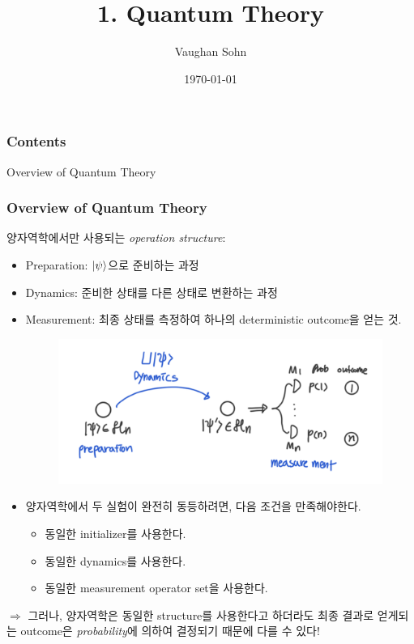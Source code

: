 \documentclass[9pt]{beamer}
\title{1. Quantum Theory}
\date{\today}
\author{Vaughan Sohn}
\begin{document}
    \maketitle
    
    \begin{frame}
        \frametitle{Contents}
        \tableofcontents
    \end{frame}

    \begin{section}{Overview of Quantum Theory}
        \begin{frame}
            \frametitle{Overview of Quantum Theory}
            양자역학에서만 사용되는 \textit{operation structure}:
            \begin{itemize}
                \item Preparation: $\ket{\psi}$으로 준비하는 과정
                \item Dynamics: 준비한 상태를 다른 상태로 변환하는 과정
                \item Measurement: 최종 상태를 측정하여 하나의 deterministic outcome을 얻는 것.
                    \vspace{0.2cm}
                    \begin{figure}
                        \includegraphics[width=0.55\columnwidth]{image/L1_general_quantum.png}
                    \end{figure}
                \item 양자역학에서 두 실험이 완전히 동등하려면, 다음 조건을 만족해야한다. 
                \begin{itemize}
                    \item 동일한 initializer를 사용한다.
                    \item 동일한 dynamics를 사용한다.
                    \item 동일한 measurement operator set을 사용한다.
                \end{itemize}
            \end{itemize}
            \vspace{0.2cm}
            $\Rightarrow$ 그러나, 양자역학은 동일한 structure를 사용한다고 하더라도 최종 결과로 얻게되는 outcome은 \textit{probability}에 의하여 결정되기 때문에 다를 수 있다!
        \end{frame}


\end{section}
\end{document}
